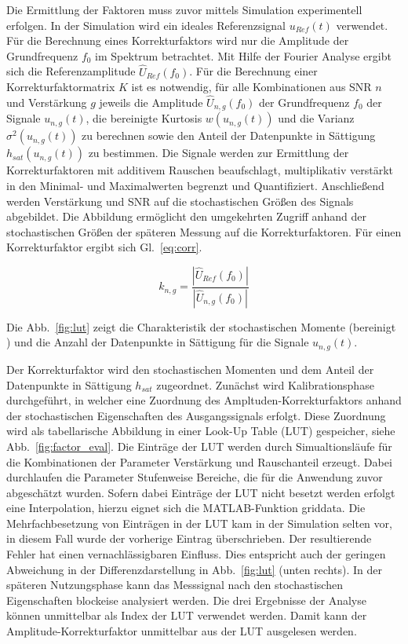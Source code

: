 Die Ermittlung der Faktoren muss zuvor mittels Simulation experimentell erfolgen. In der Simulation wird ein ideales Referenzsignal $u_{Ref}(t)$ verwendet. Für die Berechnung eines Korrekturfaktors wird nur die Amplitude der Grundfrequenz $f_0$ im Spektrum betrachtet. Mit Hilfe der Fourier Analyse ergibt sich die Referenzamplitude $\hat{U}_{Ref}(f_0)$. Für die Berechnung einer Korrekturfaktormatrix $K$ ist es notwendig, für alle Kombinationen aus SNR $n$ und Verstärkung $g$ jeweils die Amplitude $\hat{U}_{n,g}(f_0)$ der Grundfrequenz $f_0$ der Signale $u_{n,g}(t)$, die bereinigte Kurtosis $w(u_{n,g}(t))$ und die Varianz $\sigma^2(u_{n,g}(t))$ zu berechnen sowie den Anteil der Datenpunkte in Sättigung $h_{sat}(u_{n,g}(t))$ zu bestimmen. Die Signale werden zur Ermittlung der Korrekturfaktoren mit additivem Rauschen beaufschlagt, multiplikativ verstärkt in den Minimal- und Maximalwerten begrenzt und Quantifiziert. Anschließend werden Verstärkung und SNR auf die stochastischen Größen des Signals abgebildet. Die Abbildung ermöglicht den umgekehrten Zugriff anhand der stochastischen Größen der späteren Messung auf die Korrekturfaktoren.
Für einen Korrekturfaktor ergibt sich Gl.~\eqref{eq:corr}.

\begin{equation}
	\label{eq:corr}
k_{n,g} = \frac{|\hat{U}_{Ref}(f_0)|}{|\hat{U}_{n,g}(f_0)|} %
\end{equation}

Die Abb.~\ref{fig:lut} zeigt die Charakteristik der stochastischen Momente (bereinigt ) und die Anzahl der Datenpunkte in Sättigung für die Signale $u_{n,g}(t)$. 

Der Korrekturfaktor wird den stochastischen Momenten und dem Anteil der Datenpunkte in Sättigung $h_{sat}$ zugeordnet.
Zunächst wird Kalibrationsphase durchgeführt, in welcher eine Zuordnung des Ampltuden-Korrekturfaktors anhand der stochastischen Eigenschaften des Ausgangssignals erfolgt. Diese Zuordnung wird als tabellarische Abbildung in einer Look-Up Table (LUT) gespeicher, siehe Abb.~\ref{fig:factor_eval}. 
Die Einträge der LUT werden durch Simualtionsläufe für die Kombinationen der Parameter Verstärkung und Rauschanteil erzeugt. Dabei durchlaufen die Parameter Stufenweise Bereiche, die für die Anwendung zuvor abgeschätzt wurden. Sofern dabei Einträge der LUT nicht besetzt werden erfolgt eine Interpolation, hierzu eignet sich die MATLAB-Funktion griddata. Die Mehrfachbesetzung von Einträgen in der LUT kam in der Simulation selten vor, in diesem Fall wurde der vorherige Eintrag überschrieben. Der resultierende Fehler hat einen vernachlässigbaren Einfluss. Dies entspricht auch der geringen Abweichung in der Differenzdarstellung in Abb.~\ref{fig:lut} (unten rechts). In der späteren Nutzungsphase kann das Messsignal nach den stochastischen Eigenschaften blockeise analysiert werden. Die drei Ergebnisse der Analyse können unmittelbar als Index der LUT verwendet werden. Damit kann der Amplitude-Korrekturfaktor unmittelbar aus der LUT ausgelesen werden. 

